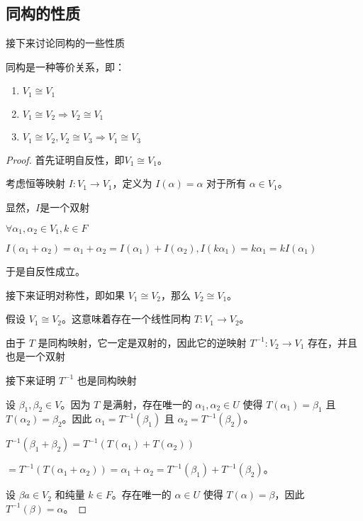 \documentclass[12pt, a4paper, oneside, UTF8]{ctexbook}
\begin{document}
		\subsection{同构的性质}
			接下来讨论同构的一些性质
			\begin{para}{0}
				\point{}
					\begin{proposition}
						同构是一种等价关系，即：

						\begin{enumerate}
							\item $V_1 \cong V_1$
							\item $V_1 \cong V_2 \Rightarrow V_2 \cong V_1$
							\item $V_1 \cong V_2 ,V_2 \cong V_3 \Rightarrow V_1 \cong V_3$
						\end{enumerate}
					\end{proposition}
					\begin{proof}
						首先证明自反性，即$V_1 \cong V_1$。

						考虑恒等映射 $I: V_1 \to V_1$，定义为 $I(\alpha ) = \alpha $ 对于所有 $\alpha  \in V_1$。
							
						显然，$I$是一个双射

						$\forall \alpha_1, \alpha _2 \in V_1,k \in F$

						$I(\alpha _1 + \alpha _2) = \alpha _1 + \alpha _2 = I(\alpha _1) + I(\alpha _2),I(k \alpha _1) = k \alpha _1 = k I(\alpha _1)$

						于是自反性成立。

						接下来证明对称性，即如果 $V_1 \cong V_2$，那么 $V_2 \cong V_1$。

						假设 $V_1 \cong V_2$。这意味着存在一个线性同构 $T: V_1 \to V_2$。
						
						由于 $T$ 是同构映射，它一定是双射的，因此它的逆映射 $T^{-1}: V_2 \to V_1$ 存在，并且也是一个双射

						接下来证明 $T^{-1}$ 也是同构映射

						设 $\beta_1, \beta_2 \in V$。因为 $T$ 是满射，存在唯一的 $\alpha _1, \alpha _2 \in U$ 使得 $T(\alpha _1) = \beta _1$ 且 $T(\alpha _2) = \beta _2$。因此 $\alpha _1 = T^{-1}(\beta _1)$ 且 $\alpha _2 = T^{-1}(\beta _2)$。
						
						$T^{-1}(\beta_1 + \beta _2) = T^{-1}(T(\alpha _1) + T(\alpha _2))$

						$= T^{-1}(T(\alpha _1 + \alpha _2)) = \alpha _1 + \alpha _2 = T^{-1}(\beta _1) + T^{-1}(\beta _2)$。

						设 $\beta a  \in V_2$ 和纯量 $k \in F$。存在唯一的 $\alpha  \in U$ 使得 $T(\alpha ) = \beta $，因此 $T^{-1}(\beta )=\alpha $。
						

\end{proof}
\end{para}
\end{document}

